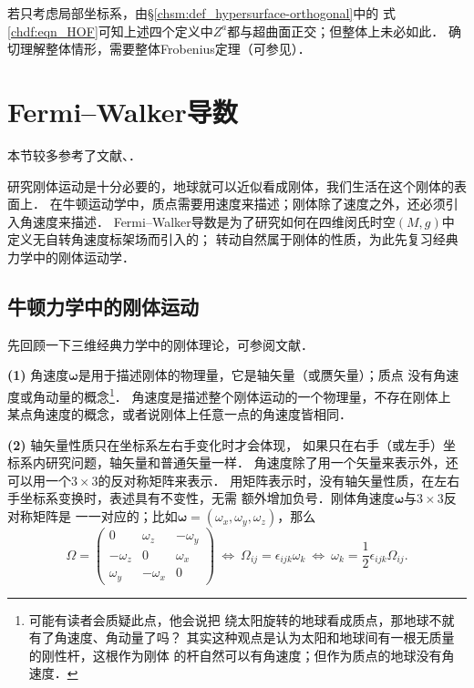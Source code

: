 若只考虑局部坐标系，由\S\ref{chsm:def_hypersurface-orthogonal}中的
式\eqref{chdf:eqn_HOF}可知上述四个定义中$Z^a$都与超曲面正交；但整体上未必如此．
确切理解整体情形，需要整体Frobenius定理（可参见\parencite[\S 6.6-6.7]{spivak-dif-1}）．






\section{Fermi--Walker导数}
本节较多参考了文献\parencite[\S 4.1]{hawking-ellis1973}、\parencite[\S 6.5]{mtw1973}．

研究刚体运动是十分必要的，地球就可以近似看成刚体，我们生活在这个刚体的表面上．
在牛顿运动学中，质点需要用速度来描述；刚体除了速度之外，还必须引入角速度来描述．
Fermi--Walker导数是为了研究如何在四维闵氏时空$(M,g)$中定义无自转角速度标架场而引入的；
转动自然属于刚体的性质，为此先复习经典力学中的刚体运动学．

\subsection{牛顿力学中的刚体运动}
先回顾一下三维经典力学中的刚体理论，可参阅文献\parencite[Ch. 3]{zhuzx-zy-vI}．

{\bfseries (1)} 角速度$\boldsymbol{\omega}$是用于描述刚体的物理量，它是轴矢量（或赝矢量）；质点
没有角速度或角动量的概念{\footnote{可能有读者会质疑此点，他会说把
        绕太阳旋转的地球看成质点，那地球不就有了角速度、角动量了吗？
        其实这种观点是认为太阳和地球间有一根无质量的刚性杆，这根作为刚体
        的杆自然可以有角速度；但作为质点的地球没有角速度．}}．
角速度是描述整个刚体运动的一个物理量，不存在刚体上
某点角速度的概念，或者说刚体上任意一点的角速度皆相同．

{\bfseries (2)} 轴矢量性质只在坐标系左右手变化时才会体现，
如果只在右手（或左手）坐标系内研究问题，轴矢量和普通矢量一样．
角速度除了用一个矢量来表示外，还可以用一个$3\times 3$的反对称矩阵来表示．
用矩阵表示时，没有轴矢量性质，在左右手坐标系变换时，表述具有不变性，无需
额外增加负号．刚体角速度$\boldsymbol{\omega}$与$3\times 3$反对称矩阵是
一一对应的；比如$\boldsymbol{\omega}=(\omega_x,\omega_y,\omega_z)$，那么
\begin{equation}\label{chfd:eqn_jsd}
    \Omega=\begin{pmatrix}
        0 &  \omega_z & -\omega_y \\
        -\omega_z& 0 & \omega_x \\
        \omega_y & -\omega_x & 0
    \end{pmatrix}
    \ \Leftrightarrow \
    \Omega_{ij}= \epsilon_{ijk} \omega_k
    \ \Leftrightarrow \
    \omega_k = \frac{1}{2}\epsilon_{ijk} \Omega_{ij} .
\end{equation}

